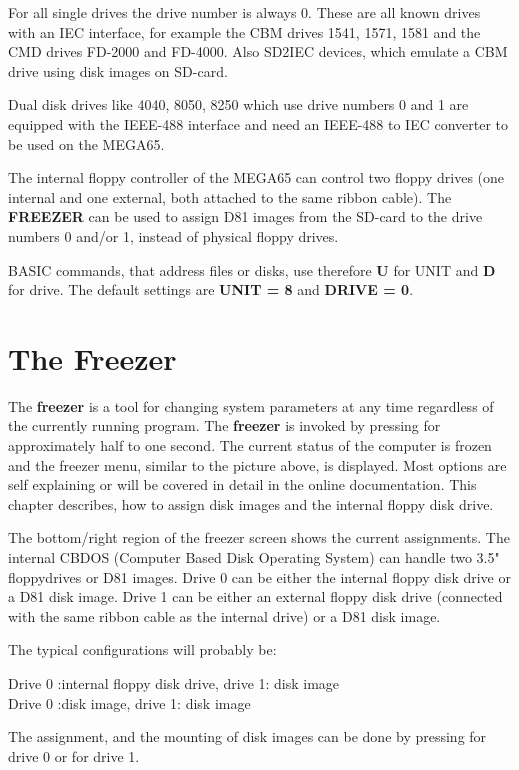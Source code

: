 For all single drives the drive number is always 0.
These are all known drives with an IEC interface, for example
the CBM drives 1541, 1571, 1581 and the CMD drives FD-2000 and FD-4000.
Also SD2IEC devices, which emulate a CBM drive using disk images on
SD-card.

Dual disk drives like 4040, 8050, 8250 which use drive numbers
0 and 1 are equipped with the IEEE-488 interface and need
an IEEE-488 to IEC converter to be used on the MEGA65.

The internal floppy controller of the MEGA65 can control
two floppy drives (one internal and one external, both attached to the same
ribbon cable). The {\bf FREEZER} can be used to assign D81 images from the
SD-card to the drive numbers 0 and/or 1, instead of physical floppy drives.

BASIC commands, that address files or disks, use therefore
{\bf U} for UNIT and {\bf D} for drive.
The default settings are {\bf UNIT = 8} and {\bf DRIVE = 0}.

\section{The Freezer}
The {\bf freezer} is a tool for changing system parameters at any time
regardless of the currently running program. The {\bf freezer} is invoked
by pressing  for approximately half to one second.
The current status of the computer is frozen and the freezer menu,
similar to the picture above, is displayed.
Most options are self explaining or will be covered in detail in the
online documentation. This chapter describes, how to assign disk images
and the internal floppy disk drive.

The bottom/right region of the freezer screen shows the current assignments.
The internal CBDOS (Computer Based Disk Operating System) can handle two
3.5" floppydrives or D81 images.
Drive 0 can be either the internal floppy disk drive or a D81 disk image.
Drive 1 can be either an external floppy disk drive (connected with the
same ribbon cable as the internal drive) or a D81 disk image.

The typical configurations will probably be:

Drive 0 :internal floppy disk drive, drive 1: disk image \\
Drive 0 :disk image, drive 1: disk image

The assignment, and the mounting of disk images can be done by pressing
 for drive 0 or  for drive 1.

